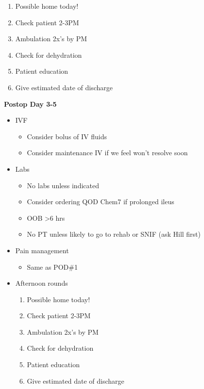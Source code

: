 \documentclass[
]{book}
\providecommand{\tightlist}{%
  \setlength{\itemsep}{0pt}\setlength{\parskip}{0pt}}
\begin{document}
\begin{enumerate}
\def\labelenumi{\arabic{enumi})}
\tightlist
\item
  Possible home today!
\item
  Check patient 2-3PM
\item
  Ambulation 2x's by PM
\item
  Check for dehydration
\item
  Patient education
\item
  Give estimated date of discharge
\end{enumerate}

\textbf{Postop Day 3-5}

\begin{itemize}
\item
  IVF

  \begin{itemize}
  \tightlist
  \item
    Consider bolus of IV fluids
  \item
    Consider maintenance IV if we feel won't resolve soon
  \end{itemize}
\item
  Labs

  \begin{itemize}
  \tightlist
  \item
    No labs unless indicated
  \item
    Consider ordering QOD Chem7 if prolonged ileus
  \item
    OOB \textgreater6 hrs
  \item
    No PT unless likely to go to rehab or SNIF (ask Hill first)
  \end{itemize}
\item
  Pain management

  \begin{itemize}
  \tightlist
  \item
    Same as POD\#1
  \end{itemize}
\item
  Afternoon rounds

  \begin{enumerate}
  \def\labelenumi{\arabic{enumi})}
  \tightlist
  \item
    Possible home today!
  \item
    Check patient 2-3PM
  \item
    Ambulation 2x's by PM
  \item
    Check for dehydration
  \item
    Patient education
  \item
    Give estimated date of discharge
  \end{enumerate}
\end{itemize}
\end{document}
